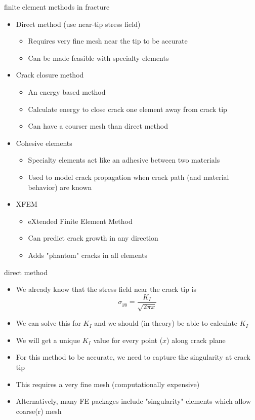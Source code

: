 \documentclass[10pt]{beamer}
\begin{document}
	\begin{frame}{finite element methods in fracture}
		\begin{itemize}[<+->]
			\item Direct method (use near-tip stress field)
			\begin{itemize}
				\item Requires very fine mesh near the tip to be accurate
				\item Can be made feasible with specialty elements
			\end{itemize}
			\item Crack closure method
			\begin{itemize}
				\item An energy based method
				\item Calculate energy to close crack one element away from crack tip
				\item Can have a courser mesh than direct method
			\end{itemize}
			\item Cohesive elements
			\begin{itemize}
				\item Specialty elements act like an adhesive between two materials
				\item Used to model crack propagation when crack path (and material behavior) are known
			\end{itemize}
			\item XFEM
			\begin{itemize}
				\item eXtended Finite Element Method
				\item Can predict crack growth in any direction
				\item Adds "phantom" cracks in all elements
			\end{itemize}
		\end{itemize}
	\end{frame}
	
	\begin{frame}{direct method}
		\begin{itemize}[<+->]
			\item We already know that the stress field near the crack tip is
			\begin{equation*}
			\sigma_{yy} = \frac{K_I}{\sqrt{2 \pi x}}
			\end{equation*}
			\item We can solve this for $K_I$ and we should (in theory) be able to calculate $K_I$
			\item We will get a unique $K_I$ value for every point ($x$) along crack plane
			\item For this method to be accurate, we need to capture the singularity at crack tip
			\item This requires a very fine mesh (computationally expensive)
			\item Alternatively, many FE packages include "singularity" elements which allow coarse(r) mesh
		\end{itemize}
	\end{frame}
	
\end{document}
